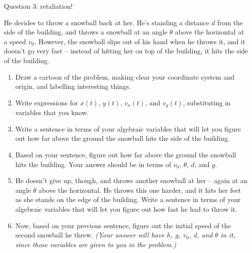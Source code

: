 \documentclass[12pt]{article}
\begin{document}
\newpage

\centerline{\Large Question 3: retaliation!}     

He decides to throw a snowball back at her. He's standing a distance $d$ from the side of the building, and 
throws a snowball at an angle $\theta$ above the horizontal at a speed $v_0$. However, the snowball slips out of his hand when he throws it,
and it doesn't go very fast -- instead of hitting her on top of the building, it hits the side of the building.

\begin{enumerate}

\item Draw a cartoon of the problem, making clear your coordinate system and origin, and
labelling interesting things.

\vspace{2in}

\item Write expressions for $x(t)$, $y(t)$, $v_x(t)$, and $v_y(t)$, substituting in variables that you know.

\vspace{1.5in}

\item Write a sentence in terms of your algebraic variables that will let you figure out how far above the ground 
the snowball hits the side of the building.

\newpage

\item Based on your sentence, figure out how far above the ground the snowball hits the building. Your answer should be 
in terms of $v_0$, $\theta$, $d$, and $g$.

\vspace{3in}

\item He doesn't give up, though, and throws another snowball at her -- again at an angle $\theta$ above the horizontal.
He throws this one harder, and it hits her feet as she stands on the edge of the building. Write a sentence in terms of your algebraic variables that will let you figure out how fast he had to throw it. 

\vspace{1in}

\item Now, based on your previous sentence, figure out the initial speed of the second snowball he threw. {\it (Your answer will have $h$, $g$, $v_0$, $d$, and $\theta$ in it, since those variables are given to you in the problem.)}

\end{enumerate}
\end{document}
